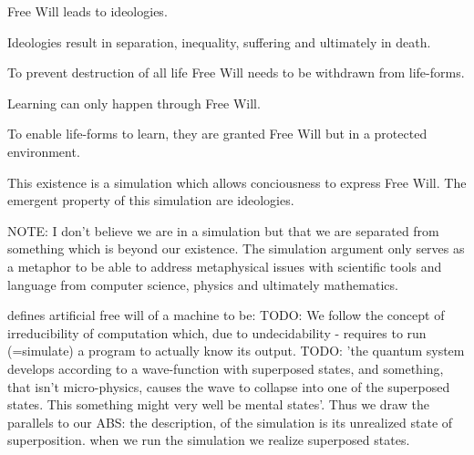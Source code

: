 \begin{theorem}
Free Will leads to ideologies.
\end{theorem}

\begin{theorem}
Ideologies result in separation, inequality, suffering and ultimately in death.
\end{theorem}

\begin{theorem}
To prevent destruction of all life Free Will needs to be withdrawn from life-forms.
\end{theorem}

\begin{theorem}
Learning can only happen through Free Will.
\end{theorem}

\begin{theorem}
To enable life-forms to learn, they are granted Free Will but in a protected environment.
\end{theorem}

\begin{corollary}
This existence is a simulation which allows conciousness to express Free Will. The emergent property of this simulation are ideologies.
\end{corollary}

NOTE:  I don't believe we are in a simulation but that we are separated from something which is beyond our existence. The simulation argument only serves as a metaphor to be able to address metaphysical issues with scientific tools and language from computer science, physics and ultimately mathematics.

\cite{irtem_simulation_1978} defines artificial free will of a machine to be:
TODO: We follow the concept of irreducibility of computation which, due to undecidability - requires to run (=simulate) a program to actually know its output.
TODO: 'the quantum system develops according to a wave-function with superposed states, and something, that isn't micro-physics, causes the wave to collapse into one of the superposed states. This something might very well be mental states'. Thus we draw the parallels to our ABS: the description, of the simulation is its unrealized state of superposition. when we run the simulation we realize superposed states. 

